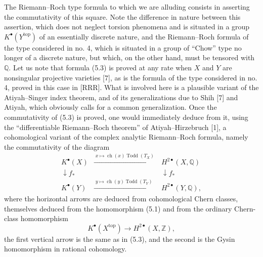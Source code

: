 \documentclass[11pt]{article}
\newcommand{\ch}{\operatorname{ch}}
\newcommand{\Todd}{\operatorname{Todd}}
\begin{document}
The Riemann--Roch type formula to which we are alluding consists in asserting the commutativity of this square. Note the difference in nature between this assertion, which does not neglect torsion phenomena and is situated in a group $K^\bullet(Y^{\mathrm{top}})$ of an essentially discrete nature, and the Riemann--Roch formula of the type considered in no. 4, which is situated in a group of ``Chow'' type no longer of a discrete nature, but which, on the other hand, must be tensored with $\mathbb Q$. Let us note that formula (5.3) is proved at any rate when $X$ and $Y$ are nonsingular projective varieties [7], as is the formula of the type considered in no. 4, proved in this case in [RRR]. What is involved here is a plausible variant of the Atiyah--Singer index theorem, and of its generalizations due to Shih [7] and Atiyah, which obviously calls for a common generalization. Once the commutativity of (5.3) is proved, one would immediately deduce from it, using the ``differentiable Riemann--Roch theorem'' of Atiyah--Hirzebruch [1], a cohomological variant of the complex analytic Riemann--Roch formula, namely the commutativity of the diagram
\begin{equation}\tag{5.4}
\begin{array}{ccc}
K^\bullet(X) & \xrightarrow{\;x\mapsto \ch(x)\Todd(T_X)\;} & H^{2\bullet}(X,\mathbb Q) \\
\downarrow f_* && \downarrow f_* \\
K^\bullet(Y) & \xrightarrow{\;y\mapsto \ch(y)\Todd(T_Y)\;} & H^{2\bullet}(Y,\mathbb Q),
\end{array}
\end{equation}
where the horizontal arrows are deduced from cohomological Chern classes, themselves deduced from the homomorphism (5.1) and from the ordinary Chern-class homomorphism
\[
K^\bullet(X^{\mathrm{top}})\longrightarrow H^{2\bullet}(X,\mathbb Z),
\]
the first vertical arrow is the same as in (5.3), and the second is the Gysin homomorphism in rational cohomology.
\end{document}
